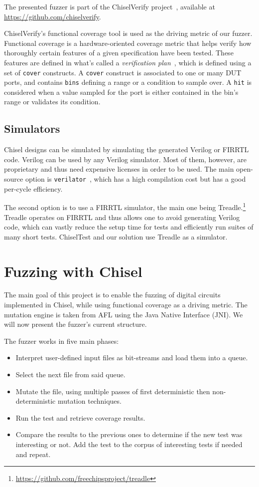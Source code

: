 \documentclass[conference]{IEEEtran}
\begin{document}
The presented fuzzer is part of the ChiselVerify project~\cite{verify:chisel:2020, dobis2021opensource}, available
at \url{https://github.com/chiselverify}.

ChiselVerify's functional coverage tool is used as the driving metric of our fuzzer.
Functional coverage is a hardware-oriented coverage metric that helps verify how thoroughly certain features of a given specification have been tested.
These features are defined in what's called a \textit{verification plan}~\cite{spear2008systemverilog}, which is defined using a set of \texttt{cover} constructs. 
A \texttt{cover} construct is associated to one or many DUT ports, and contains \texttt{bins} defining a range or a condition to sample over.
A \texttt{hit} is considered when a value sampled for the port is either contained in the bin's range or validates its condition.

\subsection{Simulators}

Chisel designs can be simulated by simulating the generated Verilog or FIRRTL code.
Verilog can be used by any Verilog simulator.
Most of them, however, are proprietary and thus need expensive licenses in order to be used. 
The main open-source option is \texttt{verilator}~\cite{verilator}, which has a high compilation cost but has a good per-cycle efficiency.

The second option is to use a FIRRTL simulator, the main one being Treadle.\footnote{\url{https://github.com/freechipsproject/treadle}}
Treadle operates on FIRRTL and thus allows one to avoid generating Verilog code, which can vastly reduce the setup time for tests and efficiently run suites of many short tests.
ChiselTest and our solution use Treadle as a simulator. 

\section{Fuzzing with Chisel}
\label{sec:fuzz}
The main goal of this project is to enable the fuzzing of digital circuits implemented in Chisel, while using functional coverage as a driving metric.
The mutation engine is taken from AFL using the Java Native Interface (JNI).
We will now present the fuzzer's current structure.

The fuzzer works in five main phases:  
\begin{itemize}
\item Interpret user-defined input files as bit-streams and load them into a queue.
\item Select the next file from said queue.
\item Mutate the file, using multiple passes of first deterministic then non-deterministic mutation techniques.  
\item Run the test and retrieve coverage results. 
\item Compare the results to the previous ones to determine if the new test was interesting or not. Add the test to the corpus of interesting tests if needed and repeat. 
\end{itemize}  
\end{document}
